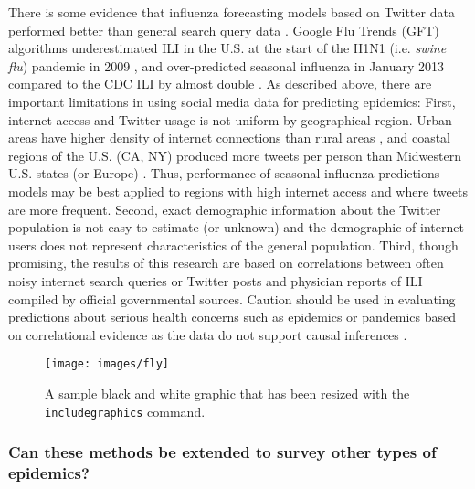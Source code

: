 \documentclass[sigconf]{acmart}
\begin{document}
There is some evidence that influenza forecasting models based on Twitter data performed 
better than general search query data \cite{paul14}. Google Flu Trends (GFT) algorithms 
underestimated ILI in the U.S. at the start of the H1N1 (i.e. {\it swine flu}) pandemic 
in 2009 \cite{butler13}, and over-predicted seasonal influenza in January 2013 compared 
to the CDC ILI by almost double \cite{lazer14}. As described above, there are important 
limitations in using social media data for predicting epidemics: First, internet access 
and Twitter usage is not uniform by geographical region. Urban areas have higher density 
of internet connections than rural areas \cite{yuan13}, and coastal regions of the U.S. 
(CA, NY) produced more tweets per person than Midwestern U.S. states (or Europe) 
\cite{achrekar12}. Thus, performance of seasonal influenza predictions models may be best 
applied to regions with high internet access and where tweets are more frequent. Second, 
exact demographic information about the Twitter population is not easy to estimate (or 
unknown) and the demographic of internet users does not represent characteristics of the 
general population.  Third, though promising, the results of this research are based on 
correlations between often noisy internet search queries or Twitter posts and 
physician reports of ILI compiled by official governmental sources. Caution should be  
used in evaluating predictions about serious health concerns such as epidemics or 
pandemics based on correlational evidence as the data do not support causal inferences . 

\begin{figure}
\texttt{[image: images/fly]}
\caption{A sample black and white graphic
that has been resized with the \texttt{includegraphics} command.}
\end{figure}


\subsubsection{Can these methods be extended to survey other types of epidemics?} 
\end{document}
